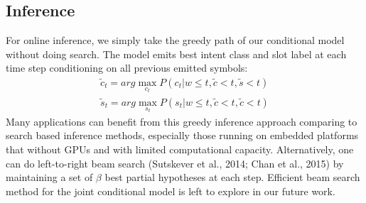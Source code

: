 \subsection{Inference}

For online inference, we simply take the greedy path of our conditional model without doing
search. The model emits best intent class and slot label at each time step conditioning on all previous emitted symbols:
\begin{eqnarray}
\tilde{c}_t = arg\max_{c_t} P(c_t|w \le t, \tilde{c}<t, \tilde{s}<t) \\
\tilde{s}_t = arg\max_{s_t} P(s_t|w \le t, \tilde{c}<t, \tilde{c}<t)
\end{eqnarray}
Many applications can benefit from this greedy inference approach comparing to search based inference methods, especially those running on embedded platforms that without GPUs and with limited computational capacity. Alternatively, one can do left-to-right beam search (Sutskever et al., 2014; Chan et al., 2015) by maintaining a set of $\beta$ best partial hypotheses at each step. Efficient beam search method for the joint conditional model is left to explore in our future work.


